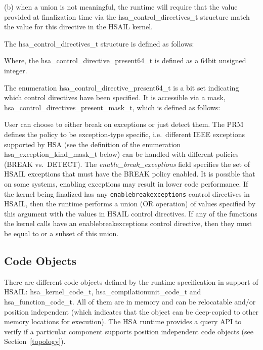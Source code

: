\documentclass{book}
\newcommand{\reffld}[1]{\textit{#1}}
\newcommand{\reftyp}[1]{#1}
\begin{document}
\begin{appendices}
(b) when a union is not meaningful, the runtime will require that the
value provided at finalization time via the
\reftyp{hsa\_control\_directives\_t} structure match the value for
this directive in the HSAIL kernel.

The \reftyp{hsa\_control\_directives\_t} structure is defined as
follows:



Where, the \reftyp{hsa\_control\_directive\_present64\_t} is defined
as a 64bit unsigned integer.


The enumeration \reftyp{hsa\_control\_directive\_present64\_t} is a
bit set indicating which control directives have been specified. It
is accessible via a mask,
\reftyp{hsa\_control\_directives\_present\_mask\_t}, which
is defined as follows:



User can choose to either break on exceptions or just detect them.
The PRM defines the policy to be exception-type specific, i.e.\ different
IEEE exceptions supported by HSA (see the definition of the
enumeration \reftyp{hsa\_exception\_kind\_mask\_t} below)  can be
handled with different policies (BREAK vs.\ DETECT).
The \reffld{enable\_break\_exceptions} field specifies the set of
HSAIL exceptions that must have the BREAK policy enabled. It is
possible that on some systems, enabling exceptions may result in
lower code performance.
If the kernel being finalized has any \texttt{enablebreakexceptions}
control directives in HSAIL, then the runtime performs a union (OR
operation) of values specified by this argument with the values in
HSAIL control directives. If any of the functions the kernel calls
have an enablebreakexceptions control directive, then they must be
equal to or a subset of this union.



\subsection{Code Objects}\label{finalize:codeobject}

There are different code objects defined by the runtime specification
in support of HSAIL: \reftyp{hsa\_kernel\_code\_t},
\reftyp{hsa\_compilationunit\_code\_t} and
\reftyp{hsa\_function\_code\_t}.  All of them are in memory and can be
relocatable and/or position independent (which indicates that the
object can be deep-copied to other memory locations for
execution). The HSA runtime provides a query API to verify if a
particular component supports position independent code objects (see
Section~\ref{topology}).


\end{appendices}
\end{document}
